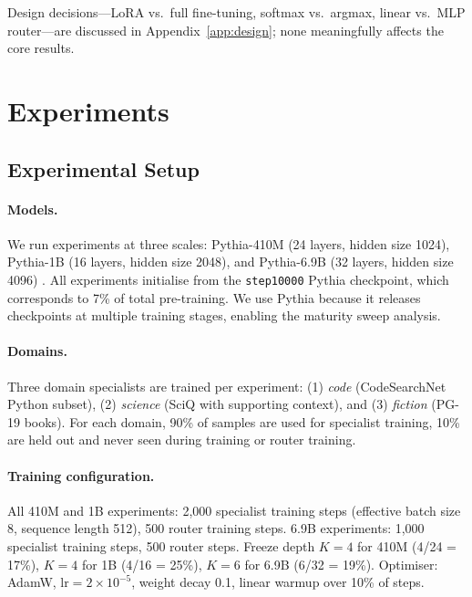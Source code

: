 \documentclass{article}
\begin{document}
Design decisions---LoRA vs.\ full fine-tuning, softmax vs.\ argmax, linear vs.\ MLP router---are discussed in Appendix~\ref{app:design}; none meaningfully affects the core results.

\section{Experiments}
\label{sec:experiments}

\subsection{Experimental Setup}
\label{sec:setup}

\paragraph{Models.} We run experiments at three scales: Pythia-410M (24 layers, hidden size 1024), Pythia-1B (16 layers, hidden size 2048), and Pythia-6.9B (32 layers, hidden size 4096) \citep{biderman2023pythia}. All experiments initialise from the \texttt{step10000} Pythia checkpoint, which corresponds to 7\% of total pre-training. We use Pythia because it releases checkpoints at multiple training stages, enabling the maturity sweep analysis.

\paragraph{Domains.} Three domain specialists are trained per experiment: (1) \emph{code} (CodeSearchNet Python subset), (2) \emph{science} (SciQ with supporting context), and (3) \emph{fiction} (PG-19 books). For each domain, 90\% of samples are used for specialist training, 10\% are held out and never seen during training or router training.

\paragraph{Training configuration.} All 410M and 1B experiments: 2,000 specialist training steps (effective batch size 8, sequence length 512), 500 router training steps. 6.9B experiments: 1,000 specialist training steps, 500 router steps. Freeze depth $K=4$ for 410M (4/24 = 17\%), $K=4$ for 1B (4/16 = 25\%), $K=6$ for 6.9B (6/32 = 19\%). Optimiser: AdamW, $\text{lr}=2\times10^{-5}$, weight decay 0.1, linear warmup over 10\% of steps.
\end{document}

